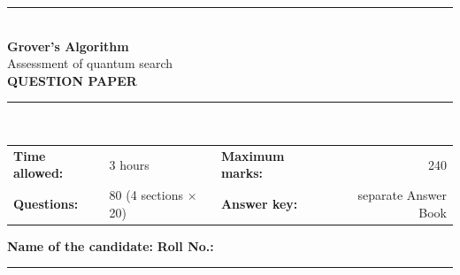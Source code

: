 \documentclass[11pt,a4paper]{article}
\begin{document}
\pagestyle{fancy}\fancyhf{}
\renewcommand{\headrulewidth}{0.4pt}

\thispagestyle{empty}
\begin{center}
{\color{brand}\rule{\linewidth}{1.2pt}}\\[6pt]
{\Huge\bfseries\color{brand} Grover's Algorithm}\\[4pt]
{\Large Assessment of quantum search}\\[4pt]
{\large\bfseries QUESTION PAPER}\\[2pt]
{\color{brand}\rule{\linewidth}{1.2pt}}\\[1pt]
\end{center}
\vspace{-2pt}
\begin{tabularx}{\linewidth}{@{}lXlr@{}}
\textbf{Time allowed:} & 3 hours & \textbf{Maximum marks:} & 240\\
\textbf{Questions:} & 80 (4 sections $\times$ 20) & \textbf{Answer key:} & separate Answer Book
\end{tabularx}
\vspace{6pt}

\textbf{Name of the candidate:} \hrulefill\quad \textbf{Roll No.:} \rule{35mm}{0.4pt}
\end{document}

